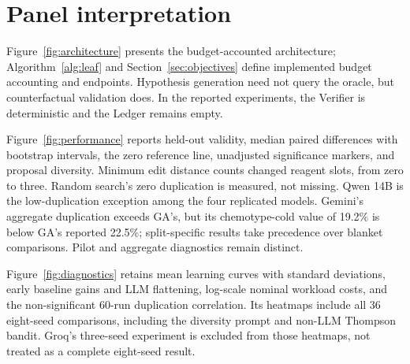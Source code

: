 \section{Panel interpretation}
Figure~\ref{fig:architecture} presents the budget-accounted architecture; Algorithm~\ref{alg:leaf} and Section~\ref{sec:objectives} define implemented budget accounting and endpoints. Hypothesis generation need not query the oracle, but counterfactual validation does. In the reported experiments, the Verifier is deterministic and the Ledger remains empty.

Figure~\ref{fig:performance} reports held-out validity, median paired differences with bootstrap intervals, the zero reference line, unadjusted significance markers, and proposal diversity. Minimum edit distance counts changed reagent slots, from zero to three. Random search's zero duplication is measured, not missing. Qwen 14B is the low-duplication exception among the four replicated models. Gemini's aggregate duplication exceeds GA's, but its chemotype-cold value of 19.2\% is below GA's reported 22.5\%; split-specific results take precedence over blanket comparisons. Pilot and aggregate diagnostics remain distinct.

Figure~\ref{fig:diagnostics} retains mean learning curves with standard deviations, early baseline gains and LLM flattening, log-scale nominal workload costs, and the non-significant 60-run duplication correlation. Its heatmaps include all 36 eight-seed comparisons, including the diversity prompt and non-LLM Thompson bandit. Groq's three-seed experiment is excluded from those heatmaps, not treated as a complete eight-seed result.


